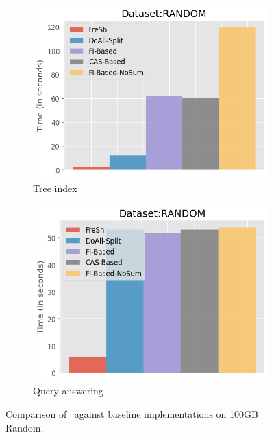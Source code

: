 \begin{figure}[htbp]
    \begin{subfigure}{0.45\textwidth}  
        \includegraphics[width=\textwidth]{figures/Experiments/baselines-random-tree.png}
        \caption{Tree index}
        \label{fig:eval:baselines:random:100GB:tree-index}
    \end{subfigure}    
    \begin{subfigure}{0.45\textwidth}  
        \includegraphics[width=\textwidth]{figures/Experiments/baselines-random-query.png}
        \caption{Query answering}
        \label{fig:eval:baselines:random:100GB:query-answering}
    \end{subfigure}    

    \caption{Comparison of \Fresh\ against baseline implementations on 100GB Random.}
    \label{fig:eval:baselines:random:100GB}
\end{figure}



